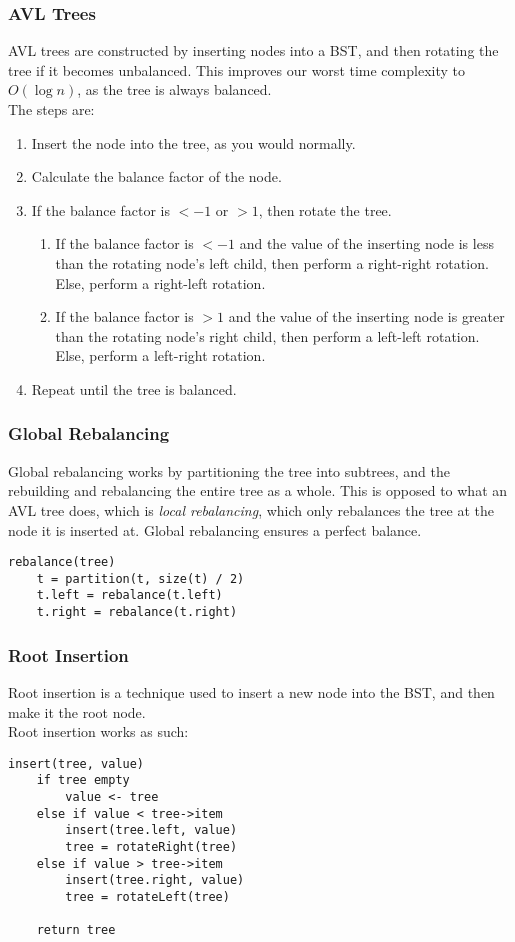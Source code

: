 \documentclass[14]{article}
\begin{document}
\subsubsection{AVL Trees}
AVL trees are constructed by inserting nodes into a BST, and then rotating the tree if it becomes unbalanced.
This improves our worst time complexity to $O(\log n)$, as the tree is always balanced. \\ 
The steps are: 
\begin{enumerate}
	\item Insert the node into the tree, as you would normally.
	\item Calculate the balance factor of the node.
	\item If the balance factor is $<-1$ or $>1$, then rotate the tree.
		\begin{enumerate}
			\item If the balance factor is $<-1$ and the value of the inserting node is less 
			than the rotating node's left child, then perform a right-right rotation.
			Else, perform a right-left rotation.
			\item If the balance factor is $>1$ and the value of the inserting node is greater
			than the rotating node's right child, then perform a left-left rotation.
			Else, perform a left-right rotation.

		\end{enumerate}
	\item Repeat until the tree is balanced.
\end{enumerate}

\subsubsection{Global Rebalancing}
Global rebalancing works by partitioning the tree into subtrees, and the rebuilding and rebalancing the entire tree
as a whole. This is opposed to what an AVL tree does, which is \emph{local rebalancing}, which only rebalances the tree
at the node it is inserted at. Global rebalancing ensures a perfect balance.
\begin{verbatim}
rebalance(tree)
    t = partition(t, size(t) / 2)
    t.left = rebalance(t.left)
    t.right = rebalance(t.right)
\end{verbatim}
\subsubsection{Root Insertion}
Root insertion is a technique used to insert a new node into the BST, and then make it the root node. \\
Root insertion works as such:
\begin{verbatim}
insert(tree, value)
    if tree empty 
        value <- tree
    else if value < tree->item
        insert(tree.left, value)
        tree = rotateRight(tree)
    else if value > tree->item
        insert(tree.right, value)
        tree = rotateLeft(tree)

    return tree
\end{verbatim}
\end{document}

